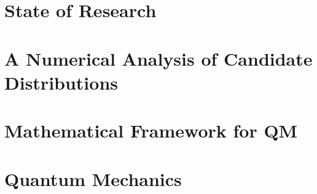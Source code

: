 \documentclass[titlepage]{report}
\theoremstyle{remark}
\begin{document}
 \chapter{State of Research}
 
 \chapter{A Numerical Analysis of Candidate Distributions}
 
% 

\begin{appendices}
	\chapter{Mathematical Framework for QM}
	
	\chapter{Quantum Mechanics}
	
%	
\end{appendices}

%
\printbibliography
\end{document}
